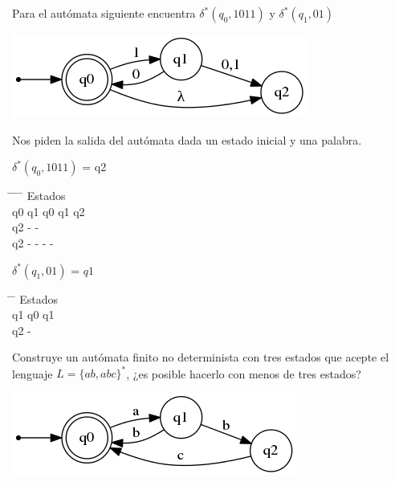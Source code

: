  
 \begin{problem}[5]
 Para el autómata siguiente encuentra $\delta^*(q_0,1011)$ y $\delta^*(q_1,01)$ 
 \begin{center}
 \includegraphics[scale=0.75]{tex/ejerciciosHoja1/automata_5.png}
 \end{center}
 
 \solution
 \begin{expla}
 Nos piden la salida del autómata dada un estado inicial y una palabra.
 \end{expla}
 

 $\delta^*(q_0,1011)$ = q2 \\
 \begin{tabbing}
   \hspace*{2cm} \= \hspace*{2cm} \= \hspace*{2cm} \= \hspace*{2cm} \= \hspace*{2cm} \kill
 Estados            \\
 q0 \> q1 \> q0 \> q1\> q2  \\
  \>  \> q2 \> - \> -\\
 q2 \> - \> - \> - \> -\\
 \end{tabbing}
 

 $\delta^*(q_1,01)$ = $q1$ \\
  \begin{tabbing}
  \hspace*{2cm} \= \hspace*{2cm} \= \hspace*{2cm} \kill
  Estados      \\
  q1 \> q0 \> q1 \\
   \> q2 \> -\\
  \end{tabbing}
  
 
 \end{problem}
 
 
 \begin{problem}[6]
 Construye un autómata finito no determinista con tres estados que acepte el lenguaje $L=\{ab,abc\}^*$, ¿es posible hacerlo con menos de tres estados?
 
 \solution
 \begin{center}
 \includegraphics[scale=0.75]{tex/ejerciciosHoja1/automata_6.png}
 \end{center}
  
 
 \end{problem}
 
